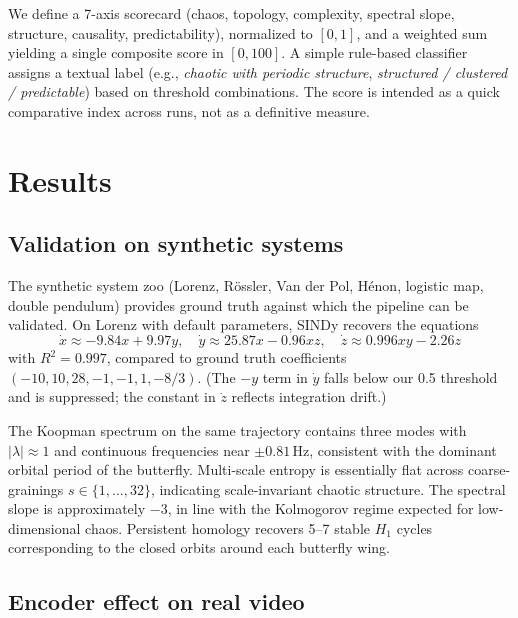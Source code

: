 \documentclass[11pt,a4paper]{article}
\begin{document}
We define a 7-axis scorecard (chaos, topology, complexity, spectral
slope, structure, causality, predictability), normalized to $[0,1]$,
and a weighted sum yielding a single composite score in $[0, 100]$.
A simple rule-based classifier assigns a textual label (e.g.,
\emph{chaotic with periodic structure}, \emph{structured / clustered
/ predictable}) based on threshold combinations. The score is
intended as a quick comparative index across runs, not as a
definitive measure.

\section{Results}
\label{sec:results}

\subsection{Validation on synthetic systems}

The synthetic system zoo (Lorenz, R\"ossler, Van der Pol, H\'enon,
logistic map, double pendulum) provides ground truth against which
the pipeline can be validated. On Lorenz with default parameters,
SINDy recovers the equations
\[
\dot x \approx -9.84 x + 9.97 y, \quad
\dot y \approx 25.87 x - 0.96 xz, \quad
\dot z \approx 0.996 xy - 2.26 z
\]
with $R^2 = 0.997$, compared to ground truth coefficients
$(-10, 10, 28, -1, -1, 1, -8/3)$. (The $-y$ term in $\dot y$ falls
below our 0.5 threshold and is suppressed; the constant in
$\dot z$ reflects integration drift.)

The Koopman spectrum on the same trajectory contains three modes
with $|\lambda| \approx 1$ and continuous frequencies near
$\pm 0.81$\,Hz, consistent with the dominant orbital period of the
butterfly. Multi-scale entropy is essentially flat across
coarse-grainings $s \in \{1,\dots,32\}$, indicating scale-invariant
chaotic structure. The spectral slope is approximately $-3$, in
line with the Kolmogorov regime expected for low-dimensional chaos.
Persistent homology recovers 5--7 stable $H_1$ cycles corresponding
to the closed orbits around each butterfly wing.

\subsection{Encoder effect on real video}
\end{document}
